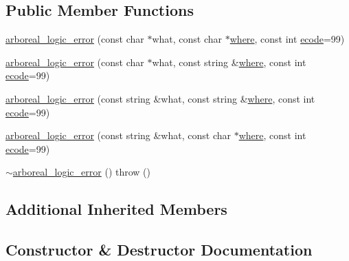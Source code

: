 \subsection*{Public Member Functions}
\begin{DoxyCompactItemize}
\item 
\mbox{\hyperlink{classarboreal__logic__error_aaea786c69fe107f9b6753b51001c59d6}{arboreal\+\_\+logic\+\_\+error}} (const char $\ast$what, const char $\ast$\mbox{\hyperlink{classarboreal__exception_a802003dee586aaeb0b0d7ce909da2dad}{where}}, const int \mbox{\hyperlink{classarboreal__exception_a318e716601c544d92ff9af25edebd725}{ecode}}=99)
\item 
\mbox{\hyperlink{classarboreal__logic__error_a70b8217c9841efc9bb1e556282a89fe0}{arboreal\+\_\+logic\+\_\+error}} (const char $\ast$what, const string \&\mbox{\hyperlink{classarboreal__exception_a802003dee586aaeb0b0d7ce909da2dad}{where}}, const int \mbox{\hyperlink{classarboreal__exception_a318e716601c544d92ff9af25edebd725}{ecode}}=99)
\item 
\mbox{\hyperlink{classarboreal__logic__error_ad7627c19a966b137cf018aa7c3075421}{arboreal\+\_\+logic\+\_\+error}} (const string \&what, const string \&\mbox{\hyperlink{classarboreal__exception_a802003dee586aaeb0b0d7ce909da2dad}{where}}, const int \mbox{\hyperlink{classarboreal__exception_a318e716601c544d92ff9af25edebd725}{ecode}}=99)
\item 
\mbox{\hyperlink{classarboreal__logic__error_a5c589df18299902a24dae25f8a25c02a}{arboreal\+\_\+logic\+\_\+error}} (const string \&what, const char $\ast$\mbox{\hyperlink{classarboreal__exception_a802003dee586aaeb0b0d7ce909da2dad}{where}}, const int \mbox{\hyperlink{classarboreal__exception_a318e716601c544d92ff9af25edebd725}{ecode}}=99)
\item 
\mbox{\hyperlink{classarboreal__logic__error_aab22b59f9195e9cb7bc8e420c3426229}{$\sim$arboreal\+\_\+logic\+\_\+error}} ()  throw ()
\end{DoxyCompactItemize}
\subsection*{Additional Inherited Members}


\subsection{Constructor \& Destructor Documentation}
\mbox{\label{classarboreal__logic__error_aaea786c69fe107f9b6753b51001c59d6}} 
